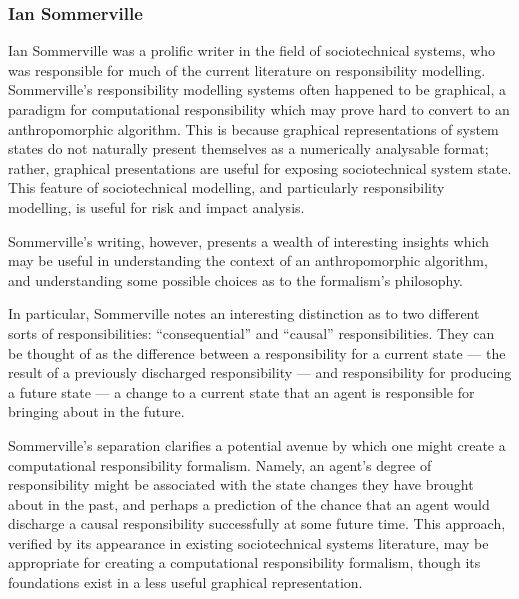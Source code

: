 \subsubsection{Ian Sommerville}
Ian Sommerville was a prolific writer in the field of sociotechnical systems, who was responsible for much of the current literature on responsibility modelling\cite{sommerville_graphical_responsibility,sommerville_dependable_systems_chap_8,sommerville_dependable_systems_chapter_9}. Sommerville's responsibility modelling systems often happened to be graphical\cite{sommerville_graphical_responsibility}, a paradigm for computational responsibility which may prove hard to convert to an anthropomorphic algorithm. This is because graphical representations of system states do not naturally present themselves as a numerically analysable format; rather, graphical presentations are useful for exposing sociotechnical system state. This feature of sociotechnical modelling, and particularly responsibility modelling, is useful for risk and impact analysis\cite{ObashiMethodology}.\par

Sommerville's writing, however, presents a wealth of interesting insights which may be useful in understanding the context of an anthropomorphic algorithm, and understanding some possible choices as to the formalism's philosophy.\par

In particular, Sommerville notes an interesting distinction as to two different sorts of responsibilities: ``consequential'' and ``causal'' responsibilities. They can be thought of as the difference between a responsibility for a current state --- the result of a previously discharged responsibility --- and responsibility for producing a future state --- a change to a current state that an agent is responsible for bringing about in the future.\par

Sommerville's separation clarifies a potential avenue by which one might create a computational responsibility formalism. Namely, an agent's degree of responsibility might be associated with the state changes they have brought about in the past, and perhaps a prediction of the chance that an agent would discharge a causal responsibility successfully at some future time. This approach, verified by its appearance in existing sociotechnical systems literature, may be appropriate for creating a computational responsibility formalism, though its foundations exist in a less useful graphical representation.\par

